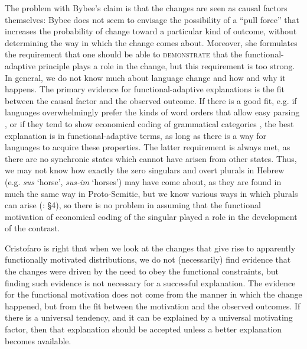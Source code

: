\documentclass[output=paper]{langsci/langscibook}
\begin{document}
The problem with Bybee’s claim is that the changes are seen as causal factors themselves: Bybee does not seem to envisage the possibility of a “pull force” that increases the probability of change toward a particular kind of outcome, without determining the way in which the change comes about. Moreover, she formulates the requirement that one should be able to \textsc{demonstrate} that the functional-adaptive principle plays a role in the change, but this requirement is too strong. In general, we do not know much about language change and how and why it happens. The primary evidence for functional-adaptive explanations is the fit between the causal factor and the observed outcome. If there is a good fit, e.g. if languages overwhelmingly prefer the kinds of word orders that allow easy parsing \citep{Hawkins2014_VarEff}, or if they tend to show economical coding of grammatical categories \citep{Haspelmath2008_FreqIcon}, the best explanation is in functional-adaptive terms, as long as there is a way for languages to acquire these properties. The latter requirement is always met, as there are no synchronic states which cannot have arisen from other states. Thus, we may not know how exactly the zero singulars and overt plurals in Hebrew (e.g. \textit{sus} ‘horse’, \textit{sus-im} ‘horses’) may have come about, as they are found in much the same way in Proto-Semitic, but we know various ways in which plurals can arise (\citealt{Cristofaro2013}: §4), so there is no problem in assuming that the functional motivation of economical coding of the singular played a role in the development of the contrast.

Cristofaro
\label{Haspelmathchapterpageref}
is right that when we look at the changes that give rise to apparently functionally motivated distributions, we do not (necessarily) find evidence that the changes were driven by the need to obey the functional constraints, but finding such evidence is not necessary for a successful explanation.
The evidence for the functional motivation does not come from the manner in which the change happened, but from the fit between the motivation and the observed outcomes. If there is a universal tendency, and it can be explained by a universal motivating factor, then that explanation should be accepted unless a better explanation becomes available.
\end{document}
